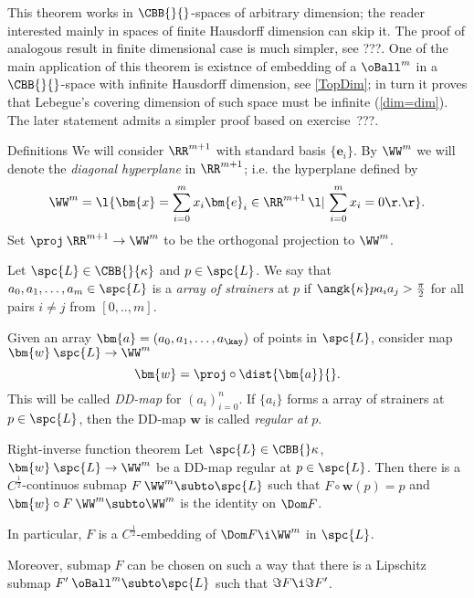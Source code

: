 This theorem works in $\CBB{}{}$-spaces of arbitrary dimension; 
the reader interested mainly in spaces of finite Hausdorff dimension can skip it.
The proof of analogous result in finite dimensional case is much simpler, see ???.
One of the main application of this theorem is existnce of embedding of a $\oBall^m$ in a $\CBB{}{}$-space with infinite Hausdorff dimension, see \ref{TopDim};
in turn it proves that Lebegue's covering dimension of such space must be infinite (\ref{dim=dim}).
The later statement admits a simpler proof based on exercise~???. 

\begin{thm}{Definitions}
We will consider $\RR^{m+1}$ with standard basis $\{\bm{e}_i\}$. 
By $\WW^m$ we will denote the \emph{diagonal hyperplane} in $\RR^{m+1}$; i.e. the hyperplane defined by 
$$\WW^m=\l\{\bm{x}=\sum_{i=0}^mx_i\bm{e}_i\in\RR^{m+1}\,\l|\,\sum_{i=0}^mx_i=0\r.\r\}.$$
Set $\proj\:\RR^{m+1}\to\WW^m$ to be the orthogonal projection to $\WW^m$.

\smallskip

Let $\spc{L}\in\CBB{}{\kappa}$ and $p\in \spc{L}$.
We say that $a_0,a_1,\dots,a_m\in \spc{L}$ is a \emph{array of strainers} at $p$ if $\angk{\kappa}p{a_i}{a_j}>\tfrac\pi2$ for all pairs $i\not=j$ from $[0,..,m]$.

\smallskip

Given an array $\bm{a}=(a_0,a_1,\dots,a_\kay)$ of points in $\spc{L}$, consider map 
${\bm{w}}\:\spc{L}\to\WW^m$
$${\bm{w}}=\proj\circ\dist{\bm{a}}{}.$$
This will be called \emph{DD-map} 
for $(a_i)_{i=0}^n$.
If $\{a_i\}$ forms a array of strainers at $p\in \spc{L}$, then the DD-map ${\bm{w}}$ is called \emph{regular at} $p$.
\end{thm}

\begin{thm}{Right-inverse function theorem}\label{thm:inverse-function}
Let $\spc{L}\in\CBB{}\kappa$,
${\bm{w}}\:\spc{L}\to \WW^m$ be a DD-map regular at $p\in \spc{L}$.
Then there is a $C^{\frac12}$-continuos submap $F\:\WW^m\subto \spc{L}$ 
such that $F\circ{\bm{w}}(p)=p$ and ${\bm{w}}\circ F\:\WW^m\subto\WW^m$ is the identity on $\Dom F$.

In particular, $F$ is a $C^{\frac12}$-embedding of $\Dom F\i \WW^m$ in $\spc{L}$.

Moreover, submap $F$ can be chosen on such a way that there is a Lipschitz submap $F'\:\oBall^m\subto \spc{L}$ such that $\Im F\i \Im F'$. 
\end{thm}


